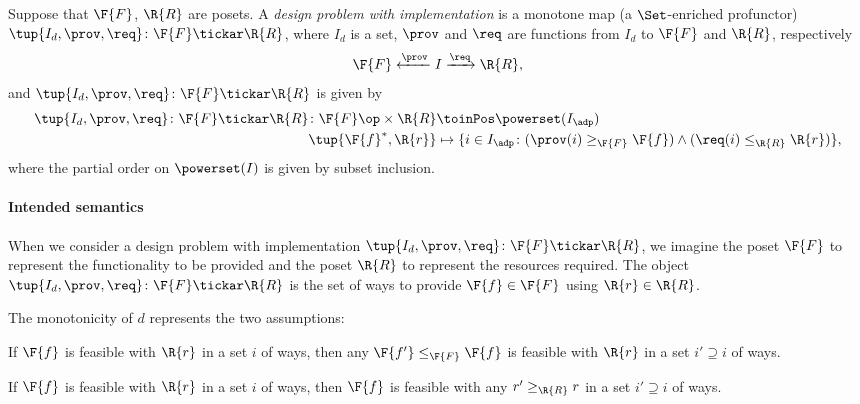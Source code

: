 \begin{definition}
\label{def:dpwithimp}
Suppose that $\F{F}$, $\R{R}$ are posets. A \emph{design problem with implementation} is a monotone map (a $\Set$-enriched profunctor) $\tup{I_d,\prov,\req}\colon \F{F}\tickar \R{R}$, where $I_d$ is a set, $\prov$ and $\req$ are functions from $I_d$ to $\F{F}$ and $\R{R}$, respectively 
\begin{equation}
    \F{F} \xleftarrow{\prov} I \xrightarrow{\req} \R{R},
\end{equation}
and $\tup{I_d,\prov,\req}\colon \F{F}\tickar \R{R}$ is given by
\begin{equation}
\begin{aligned}
\tup{I_d,\prov,\req}\colon \F{F}\tickar \R{R} \colon \F{F}\op \times \R{R} &\toinPos \powerset(I_\adp) \\
\tup{\F{f}^*, \R{r}} &\mapsto \{ i \in I_\adp \colon (\prov(i) \geq_\F{F} \F{f}) \wedge (\req(i) \leq_\R{R} \R{r}) \},
\end{aligned}
\end{equation}
where the partial order on $\powerset(I)$ is given by subset inclusion.
\end{definition}
\paragraph{Intended semantics} When we consider a design problem with implementation $\tup{I_d,\prov,\req}\colon \F{F}\tickar \R{R}$, we imagine the poset $\F{F}$ to represent the functionality to be provided and the poset $\R{R}$ to represent the resources required. The object $\tup{I_d,\prov,\req}\colon \F{F}\tickar \R{R}$ is the set of ways to provide $\F{f}\in \F{F}$ using $\R{r}\in \R{R}$.

\noindent The monotonicity of $d$ represents the two assumptions:
\begin{compactenum}
\item If $\F{f}$ is feasible with $\R{r}$ in a set $i$ of ways, then any $\F{f'}\leq_\F{F} \F{f}$ is feasible with $\R{r}$ in a set $i'\supseteq i$ of ways.
\item If $\F{f}$ is feasible with $\R{r}$ in a set $i$ of ways, then $\F{f}$ is feasible with any $r'\geq_\R{R} r$ in a set $i'\supseteq i$ of ways.
\end{compactenum}

